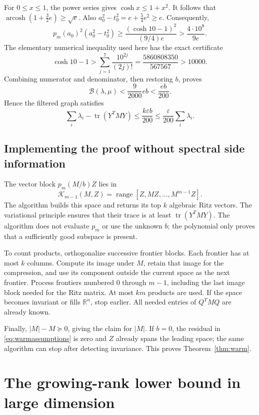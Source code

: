 \documentclass[11pt]{article}
\numberwithin{equation}{section}
\theoremstyle{definition}
\newcommand{\R}{\mathbb R}
\newcommand{\tr}{\operatorname{tr}}
\newcommand{\range}{\operatorname{range}}
\newcommand{\eps}{\varepsilon}
\newcommand{\K}{\mathcal K}
\begin{document}
For $0\le x\le1$, the power series gives $\cosh x\le1+x^2$.
It follows that $\operatorname{arcosh}(1+\frac32e)\ge\sqrt e$.
Also $a_0^2-t_0^2=e+\frac54e^2\ge e$. Consequently,
\begin{equation}
 p_m(a_0)^2(a_0^2-t_0^2)
 \ge\frac{(\cosh10-1)^2}{(9/4)e}
 >\frac{4\cdot10^8}{9e}.
 \label{eq:denominator}
\end{equation}
The elementary numerical inequality used here has the exact certificate
\[
 \cosh10-1>
 \sum_{j=1}^{7}\frac{10^{2j}}{(2j)!}
 =\frac{5860808350}{567567}>10000.
\]
Combining numerator and denominator, then restoring $b$, proves
\begin{equation}
 \mathcal B(\lambda,\mu)<\frac{9}{2000}eb
 <\frac{eb}{200}.
 \label{eq:scalarfinal}
\end{equation}
Hence the filtered graph satisfies
\[
 \sum_i\lambda_i-\tr(Y^TMY)
 \le\frac{k\eps b}{200}
 \le\frac\eps{200}\sum_i\lambda_i.
\]

\subsection{Implementing the proof without spectral side information}
The vector block $p_m(M/b)Z$ lies in
\begin{equation}
 \K_{m-1}(M,Z)=\range[Z,MZ,\ldots,M^{m-1}Z].
 \label{eq:warmkrylov}
\end{equation}
The algorithm builds this space and returns its top $k$ algebraic Ritz
vectors. The variational principle ensures that their trace is at least
$\tr(Y^TMY)$. The algorithm does not evaluate $p_m$ or use the unknown $b$;
the polynomial only proves that a sufficiently good subspace is present.

To count products, orthogonalize successive frontier blocks. Each frontier
has at most $k$ columns. Compute its image under $M$, retain that image for
the compression, and use its component outside the current space as the
next frontier. Process frontiers numbered $0$ through $m-1$, including the
last image block needed for the Ritz matrix. At most $km$ products are used.
If the space becomes invariant or fills $\R^n$, stop earlier. All needed
entries of $Q^TMQ$ are already known.

Finally, $|M|-M\succeq0$, giving the claim for $|M|$. If $b=0$, the residual
in \eqref{eq:warmassumptions} is zero and $Z$ already spans the leading
space; the same algorithm can stop after detecting invariance. This proves
Theorem~\ref{thm:warm}.

\section{The growing-rank lower bound in large dimension}
\label{sec:SAR}
\end{document}
